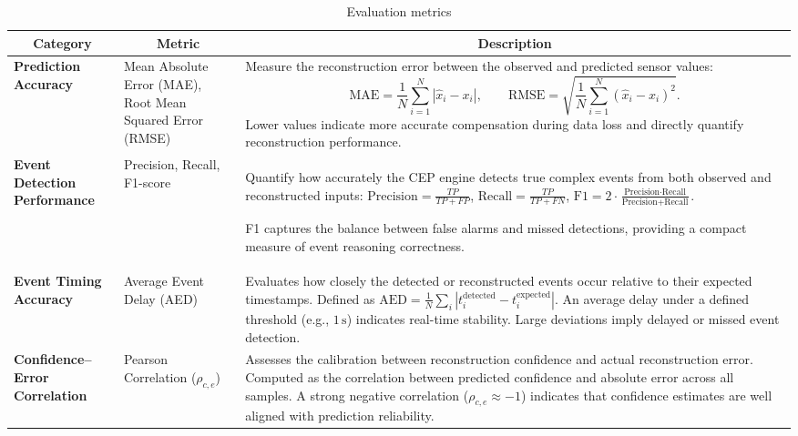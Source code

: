 \begin{table}[h!]
\centering
\caption{Evaluation metrics}
\label{tab:metrics}
\footnotesize
\setlength{\tabcolsep}{0.6em}
\begin{tabular}{@{}p{3cm}p{4.5cm}p{8.5cm}@{}}
\toprule
\multicolumn{1}{c}{\textbf{Category}} &
\multicolumn{1}{c}{\textbf{Metric}} &
\multicolumn{1}{c}{\textbf{Description}} \\  
\midrule


\textbf{Prediction Accuracy} &
Mean Absolute Error (MAE), Root Mean Squared Error (RMSE) &
Measure the reconstruction error between the observed and predicted sensor values:
\[
\text{MAE} = \frac{1}{N} \sum_{i=1}^{N} | \hat{x}_i - x_i |, 
\qquad
\text{RMSE} = \sqrt{ \frac{1}{N} \sum_{i=1}^{N} (\hat{x}_i - x_i)^2 }.
\]
Lower values indicate more accurate compensation during data loss and directly quantify reconstruction performance. \\

\addlinespace[0.4em]
\textbf{Event Detection Performance} &
Precision, Recall, F1-score &
Quantify how accurately the CEP engine detects true complex events from both observed and reconstructed inputs: 
$\text{Precision} = \tfrac{TP}{TP + FP}$, 
$\text{Recall} = \tfrac{TP}{TP + FN}$, 
$\text{F1} = 2 \cdot \tfrac{\text{Precision} \cdot \text{Recall}}{\text{Precision} + \text{Recall}}$.


F1 captures the balance between false alarms and missed detections, providing a compact measure of event reasoning correctness. \\



\addlinespace[0.4em]
\textbf{Event Timing Accuracy} &
Average Event Delay (AED) &
Evaluates how closely the detected or reconstructed events occur relative to their expected timestamps.
Defined as 
$\mathrm{AED} = \frac{1}{N}\sum_i |t_i^{\text{detected}} - t_i^{\text{expected}}|$.
An average delay under a defined threshold (e.g., $1\,\mathrm{s}$) indicates real-time stability. Large deviations imply delayed or missed event detection. \\

\addlinespace[0.4em]
\textbf{Confidence–Error Correlation} &
Pearson Correlation ($\rho_{c,e}$) &
Assesses the calibration between reconstruction confidence and actual reconstruction error. Computed as the correlation between predicted confidence and absolute error across all samples.
A strong negative correlation ($\rho_{c,e} \approx -1$) indicates that confidence estimates are well aligned with prediction reliability. \\



\bottomrule
\end{tabular}
\end{table}

\vspace{0.5em}